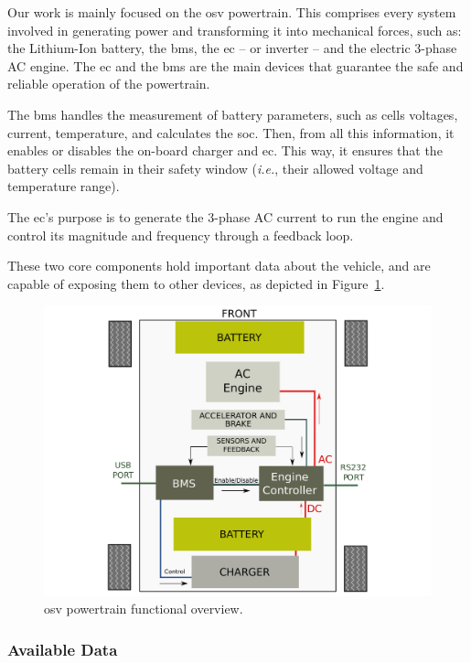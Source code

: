 \documentclass[runningheads]{llncs}
\begin{document}
Our work is mainly focused on the \gls{osv} powertrain.
This comprises every system involved in generating power and transforming it
into mechanical forces, such as: the Lithium-Ion battery, the \gls{bms}, the
\gls{ec} -- or inverter -- and the electric 3-phase AC engine.
The \gls{ec} and the \gls{bms} are the main devices that guarantee the safe and reliable operation of the powertrain.

The \gls{bms} handles the measurement of battery parameters, such as cells voltages, current, temperature, and calculates the \gls{soc}. 
Then, from all this information, it enables or disables the on-board charger and
\gls{ec}.
This way, it ensures that the battery cells remain in their safety window (\textit{i.e.}, their allowed voltage and temperature range).


The \gls{ec}'s purpose is to generate the 3-phase AC current to run the engine and control its magnitude and frequency through a feedback loop.

These two core components hold important data about the vehicle, and are capable of exposing them to other devices, as depicted in Figure~\ref{platform}.

\begin{figure}[!h]
	\includegraphics[width=\textwidth]{OSV.pdf}
	\caption{\gls{osv} powertrain functional overview.}
	\label{platform}
\end{figure}


\subsubsection{Available Data}
\end{document}
